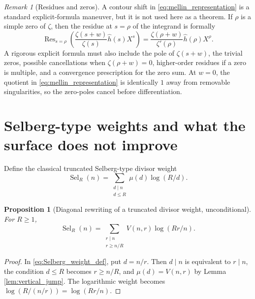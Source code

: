 \documentclass[11pt]{amsart}
\numberwithin{equation}{section}
\theoremstyle{plain}
\newtheorem{proposition}[theorem]{Proposition}
\theoremstyle{definition}
\theoremstyle{remark}
\newtheorem{remark}[theorem]{Remark}
\newcommand{\mob}{\mu}
\newcommand{\zetaR}{\zeta}
\newcommand{\Vjump}{V}
\newcommand{\Sel}{\operatorname{Sel}}
\DeclareMathOperator{\Res}{Res}
\begin{document}
\begin{remark}[Residues and zeros]
\label{rem:residue_caveats}
A contour shift in \eqref{eq:mellin_representation} is a standard explicit-formula maneuver, but it is not used here as a theorem.  If \(\rho\) is a simple zero of \(\zetaR\), then the residue at \(s=\rho\) of the integrand is formally
\begin{equation}
\Res_{s=\rho}\left(\frac{\zetaR(s+w)}{\zetaR(s)}\widehat h(s)X^s\right)
=\frac{\zetaR(\rho+w)}{\zetaR'(\rho)}\widehat h(\rho)X^\rho.
\label{eq:simple_zero_residue}
\end{equation}
A rigorous explicit formula must also include the pole of \(\zetaR(s+w)\), the trivial zeros, possible cancellations when \(\zetaR(\rho+w)=0\), higher-order residues if a zero is multiple, and a convergence prescription for the zero sum.  At \(w=0\), the quotient in \eqref{eq:mellin_representation} is identically \(1\) away from removable singularities, so the zero-poles cancel before differentiation.
\end{remark}

\section{Selberg-type weights and what the surface does not improve}
\label{sec:selberg}

Define the classical truncated Selberg-type divisor weight
\begin{equation}
\Sel_R(n)=\sum_{\substack{d\mid n\\d\le R}}\mob(d)\log(R/d).
\label{eq:Selberg_weight_def}
\end{equation}

\begin{proposition}[Diagonal rewriting of a truncated divisor weight, unconditional]
\label{prop:selberg_rewriting}
For \(R\ge1\),
\begin{equation}
\Sel_R(n)=\sum_{\substack{r\mid n\\r\ge n/R}}\Vjump(n,r)\log(Rr/n).
\label{eq:Selberg_rewriting}
\end{equation}
\end{proposition}

\begin{proof}
In \eqref{eq:Selberg_weight_def}, put \(d=n/r\).  Then \(d\mid n\) is equivalent to \(r\mid n\), the condition \(d\le R\) becomes \(r\ge n/R\), and \(\mob(d)=\Vjump(n,r)\) by Lemma \ref{lem:vertical_jump}.  The logarithmic weight becomes \(\log(R/(n/r))=\log(Rr/n)\).
\end{proof}
\end{document}
